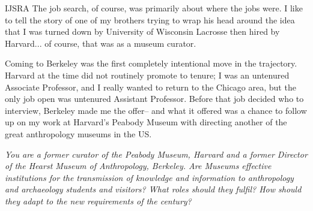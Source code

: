 \begin{labeling}{IJSRA}
The job search, of course, was primarily about where the jobs were. I like to tell the story of one of my brothers trying to wrap his head around the idea that I was turned down by University of Wisconsin Lacrosse then hired by Harvard... of course, that was as a museum curator. 

Coming to Berkeley was the first completely intentional move in the trajectory. Harvard at the time did not routinely promote to tenure; I was an untenured Associate Professor, and I really wanted to return to the Chicago area, but the only job open was untenured Assistant Professor. Before that job decided who to interview, Berkeley made me the offer-- and what it offered was a chance to follow up on my work at Harvard's Peabody Museum with directing another of the great anthropology museums in the US.
	
\item[IJSRA] \textit{You are a former curator of the Peabody Museum, Harvard and a former Director of the Hearst Museum of Anthropology, Berkeley. Are Museums effective institutions for the transmission of knowledge and information to anthropology and archaeology students and visitors? What roles should they fulfil? How should they adapt to the new requirements of the  century?}


\end{labeling}
